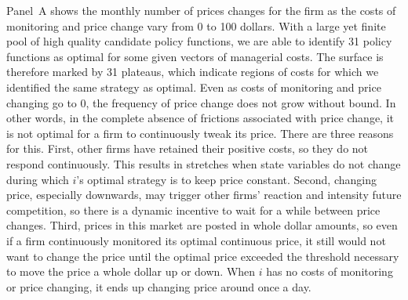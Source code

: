 \documentclass[11pt]{article}
\begin{document}
\begin{spacing}{1.3}
Panel~A shows the monthly number of prices changes for the firm as the
costs of monitoring and price change vary from 0 to 100 dollars. With
a large yet finite pool of high quality candidate policy functions, we
are able to identify 31 policy functions as optimal for some given
vectors of managerial costs. The surface is therefore marked by 31
plateaus, which indicate regions of costs for which we identified the
same strategy as optimal. Even as costs of monitoring and price
changing go to 0, the frequency of price change does not grow without
bound. In other words, in the complete absence of frictions associated
with price change, it is not optimal for a firm to continuously tweak
its price.  There are three reasons for this.  First, other firms have
retained their positive costs, so they do not respond
continuously. This results in stretches when state variables do not
change during which $i$'s optimal strategy is to keep price
constant. Second, changing price, especially downwards, may trigger
other firms' reaction and intensity future competition, so there is a
dynamic incentive to wait for a while between price changes. Third,
prices in this market are posted in whole dollar amounts, so even if a
firm continuously monitored its optimal continuous price, it still
would not want to change the price until the optimal price exceeded
the threshold necessary to move the price a whole dollar up or down.
When $i$ has no costs of monitoring or price changing, it ends up
changing price around once a day.


\end{spacing}
\end{document}
